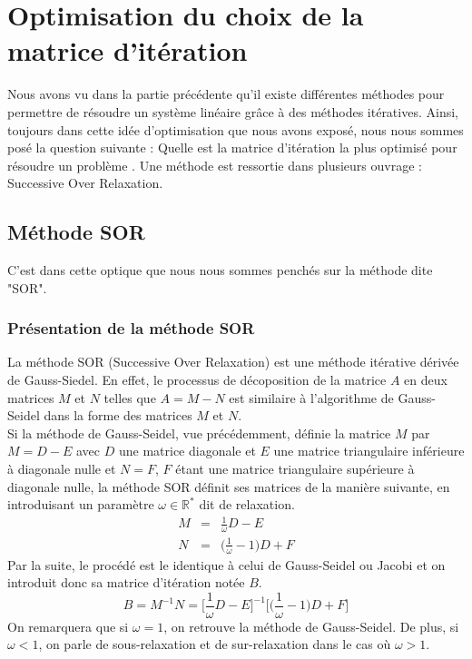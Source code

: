 \chapter{Optimisation du choix de la matrice d'itération}
Nous avons vu dans la partie précédente qu'il existe différentes méthodes pour permettre de résoudre un système linéaire grâce à des méthodes itératives. Ainsi, toujours dans cette idée d'optimisation que nous avons exposé, nous nous sommes posé la question suivante : \og Quelle est la matrice d'itération la plus optimisé pour résoudre un problème \fg. Une méthode est ressortie dans plusieurs ouvrage : Successive Over Relaxation.
\section{Méthode SOR}
C'est dans cette optique que nous nous sommes penchés sur la méthode dite "SOR".
\subsection{Présentation de la méthode SOR}
La méthode SOR (Successive Over Relaxation) est une méthode itérative dérivée de Gauss-Siedel. En effet, le processus de décoposition de la matrice $A$ en deux matrices $M$ et $N$ telles que $A=M-N$ est similaire à l'algorithme de Gauss-Seidel dans la forme des matrices $M$ et $N$.\\

Si la méthode de Gauss-Seidel, vue précédemment, définie la matrice $M$ par $M=D-E$ avec $D$ une matrice diagonale et $E$ une matrice triangulaire inférieure à diagonale nulle et $N=F$, $F$ étant une matrice triangulaire supérieure à diagonale nulle, la méthode SOR définit ses matrices de la manière suivante, en introduisant un paramètre $\omega \in \mathbb{R}^*$ dit de relaxation.
\begin{eqnarray}
M &=& \frac{1}{\omega}D-E\\
N &=& \bigg(\frac{1}{\omega}-1\bigg)D+F
\end{eqnarray}
Par la suite, le procédé est le identique à celui de Gauss-Seidel ou Jacobi et on introduit donc sa matrice d'itération notée $B$.
\begin{equation}
B=M^{-1}N=\bigg[\frac{1}{\omega}D-E\bigg]^{-1}\bigg[\bigg(\frac{1}{\omega}-1\bigg)D+F\bigg]
\end{equation}
On remarquera que si $\omega=1$, on retrouve la méthode de Gauss-Seidel. De plus, si $\omega<1$, on parle de sous-relaxation et de sur-relaxation dans le cas où $\omega>1$.
